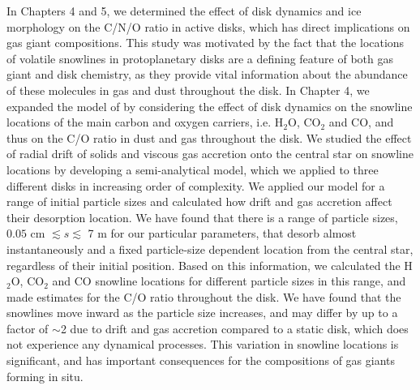 In Chapters 4 and 5, we determined the effect of disk dynamics and ice morphology on the C/N/O ratio in active disks, which has direct implications on gas giant compositions. This study was motivated by the fact that the locations of volatile snowlines in protoplanetary disks are a defining feature of both gas giant and disk chemistry, as they provide vital information about the abundance of these molecules in gas and dust throughout the disk. In Chapter 4, we expanded the model of \citet{oberg11} by considering the effect of disk dynamics on the snowline locations of the main carbon and oxygen carriers, i.e. H$_2$O, CO$_2$ and CO, and thus on the C/O ratio in dust and gas throughout the disk. We studied the effect of radial drift of solids and viscous gas accretion onto the central star on snowline locations by developing a semi-analytical model, which we applied to three different disks in increasing order of complexity. We applied our model for a range of initial particle sizes and calculated how drift and gas accretion affect their desorption location. We have found that there is a range of particle sizes, $0.05$ cm $\lesssim s \lesssim$ 7 m for our particular parameters, that desorb almost instantaneously and a fixed particle-size dependent location from the central star, regardless of their initial position. Based on this information, we calculated the H$_2$O, CO$_2$ and CO snowline locations for different particle sizes in this range, and made estimates for the C/O ratio throughout the disk. We have found that the snowlines move inward as the particle size increases, and may differ by up to a factor of $\sim$2 due to drift and gas accretion compared to a static disk, which does not experience any dynamical processes. This variation in snowline locations is significant, and has important consequences for the compositions of gas giants forming in situ. 

